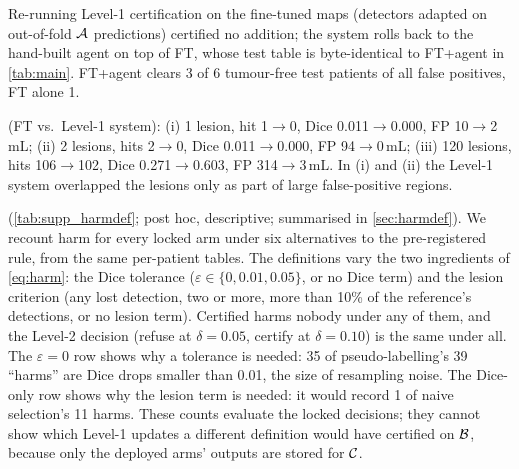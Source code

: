  Re-running Level-1 certification on the fine-tuned maps (detectors adapted on out-of-fold $\mathcal{A}$ predictions) certified no addition; the system rolls back to the hand-built agent on top of FT, whose test table is byte-identical to FT+agent in \cref{tab:main}. FT+agent clears 3 of 6 tumour-free test patients of all false positives, FT alone 1.

 (FT vs.\ Level-1 system): (i) 1 lesion, hit 1$\to$0, Dice 0.011$\to$0.000, FP 10$\to$2\,mL; (ii) 2 lesions, hits 2$\to$0, Dice 0.011$\to$0.000, FP 94$\to$0\,mL; (iii) 120 lesions, hits 106$\to$102, Dice 0.271$\to$0.603, FP 314$\to$3\,mL. In (i) and (ii) the Level-1 system overlapped the lesions only as part of large false-positive regions.

 (\cref{tab:supp_harmdef}; post hoc, descriptive; summarised in \cref{sec:harmdef}). We recount harm for every locked arm under six alternatives to the pre-registered rule, from the same per-patient tables. The definitions vary the two ingredients of \cref{eq:harm}: the Dice tolerance ($\varepsilon\in\{0,0.01,0.05\}$, or no Dice term) and the lesion criterion (any lost detection, two or more, more than 10\% of the reference's detections, or no lesion term). Certified \ours harms nobody under any of them, and the Level-2 decision (refuse at $\delta=0.05$, certify at $\delta=0.10$) is the same under all. The $\varepsilon=0$ row shows why a tolerance is needed: 35 of pseudo-labelling's 39 ``harms'' are Dice drops smaller than 0.01, the size of resampling noise. The Dice-only row shows why the lesion term is needed: it would record 1 of naive selection's 11 harms. These counts evaluate the locked decisions; they cannot show which Level-1 updates a different definition would have certified on $\mathcal{B}$, because only the deployed arms' outputs are stored for $\mathcal{C}$.

